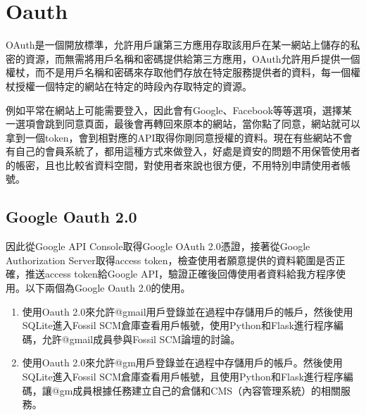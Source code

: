 \chapter{Oauth}
\renewcommand{\baselinestretch}{10} %
\par
\renewcommand{\baselinestretch}{1} %
\twelve \qquad OAuth是一個開放標準，允許用戶讓第三方應用存取該用戶在某一網站上儲存的私密的資源，而無需將用戶名稱和密碼提供給第三方應用，OAuth允許用戶提供一個權杖，而不是用戶名稱和密碼來存取他們存放在特定服務提供者的資料，每一個權杖授權一個特定的網站在特定的時段內存取特定的資源。
\par
\twelve \hspace{0.5em} 例如平常在網站上可能需要登入，因此會有Google、Facebook等等選項，選擇某一選項會跳到同意頁面，最後會再轉回來原本的網站，當你點了同意，網站就可以拿到一個token，會到相對應的API取得你剛同意授權的資料。現在有些網站不會有自己的會員系統了，都用這種方式來做登入，好處是資安的問題不用保管使用者的帳密，且也比較省資料空間，對使用者來說也很方便，不用特別申請使用者帳號。

\renewcommand{\baselinestretch}{20} %
\section{Google Oauth 2.0}
\par
\renewcommand{\baselinestretch}{1} %
\twelve \qquad 因此從Google API Console取得Google OAuth 2.0憑證，接著從Google Authorization Server取得access token，檢查使用者願意提供的資料範圍是否正確，推送access token給Google API，驗證正確後回傳使用者資料給我方程序使用。以下兩個為Google Oauth 2.0的使用。
\begin{enumerate}
\item 使用Oauth 2.0來允許@gmail用戶登錄並在過程中存儲用戶的帳戶，然後使用SQLite進入Fossil SCM倉庫查看用戶帳號，使用Python和Flask進行程序編碼，允許@gmail成員參與Fossil SCM論壇的討論。
\item 使用Oauth 2.0來允許@gm用戶登錄並在過程中存儲用戶的帳戶。然後使用SQLite進入Fossil SCM倉庫查看用戶帳號，且使用Python和Flask進行程序編碼，讓@gm成員根據任務建立自己的倉儲和CMS（內容管理系統）的相關服務。
\end{enumerate}
\par